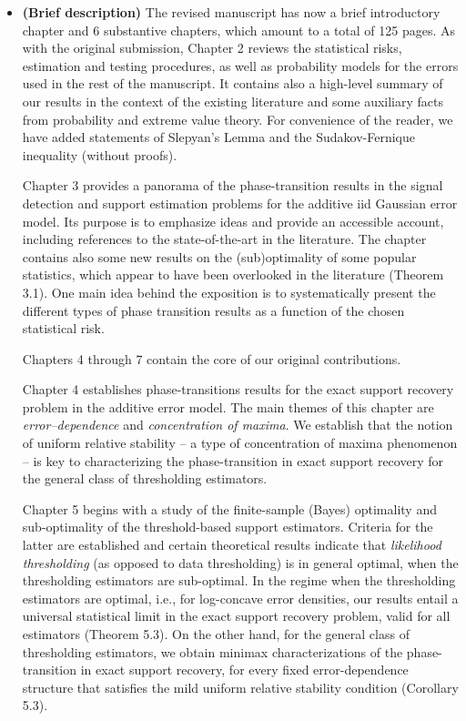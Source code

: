 \documentclass[11pt]{article}
\begin{document}
 \begin{itemize}
  \item {\bf (Brief description)} The revised manuscript has now a brief introductory chapter and 6 substantive chapters, 
  which amount to a total of 125 pages. As with the original submission,  Chapter 2 reviews the statistical risks, estimation and testing procedures,
  as well as probability models for the errors used in the rest of the manuscript.  It contains also a high-level summary of our results 
  in the context of the existing literature and some auxiliary facts from probability and extreme value theory.  For convenience of the reader, we 
  have added statements of Slepyan's Lemma and the Sudakov-Fernique inequality (without proofs).
  
   Chapter 3 provides a panorama of the phase-transition results in the signal detection and support estimation problems for the additive
   iid Gaussian error model.  Its purpose is to emphasize ideas and provide an accessible account, including references to the state-of-the-art 
   in the literature.  The chapter contains also some new results on the (sub)optimality of some popular statistics, which appear to have been 
   overlooked in the literature (Theorem 3.1).  One main idea  behind the exposition is to systematically present the different types of phase transition 
   results as a function of the chosen statistical risk.  
   
   Chapters 4 through 7 contain the core of our original contributions.  
   
   Chapter 4 establishes phase-transitions results for the exact support recovery problem in the additive error model.  The main themes of this 
   chapter are {\em error--dependence} and {\em concentration of maxima}. We establish that the notion of uniform relative stability -- 
   a type of concentration of maxima phenomenon -- is key to characterizing the phase-transition in exact support recovery for the general class 
   of thresholding estimators. 
   
   Chapter 5 begins with a study of the finite-sample (Bayes) optimality and sub-optimality of the threshold-based support estimators.  
   Criteria for the latter are established and certain theoretical results indicate that {\em likelihood thresholding} (as opposed to data thresholding)
   is in general optimal, when the thresholding estimators are sub-optimal.  In the regime when the thresholding estimators are optimal, i.e., 
   for log-concave error densities, our results entail 
   a universal statistical limit in the exact support recovery problem, valid for all estimators (Theorem 5.3).   On the other hand, for the general class of
   thresholding estimators, we obtain minimax characterizations of the phase-transition in exact support recovery, for every fixed error-dependence 
   structure that satisfies the mild uniform relative stability condition (Corollary 5.3).
   

\end{itemize}
\end{document}
